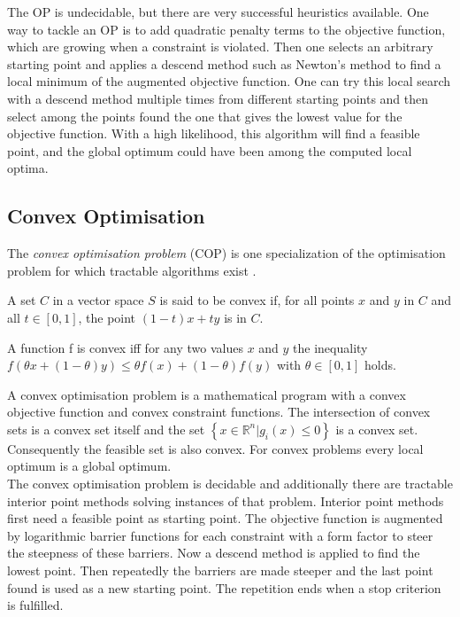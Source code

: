 The OP is undecidable, but there are very successful heuristics available. One way to tackle an OP is to add quadratic penalty terms to the objective function, which are growing when a constraint is violated. Then one selects an arbitrary starting point and applies a descend method such as Newton's method to find a local minimum of the augmented objective function. One can try this local search with a descend method multiple times from different starting points and then select among the points found the one that gives the lowest value for the objective function. With a high likelihood, this algorithm will find a feasible point, and the global optimum could have been among the computed local optima.
\subsection{Convex Optimisation}
The \emph{convex optimisation problem} (COP) is one specialization of the optimisation problem for which tractable algorithms exist \cite{Boyd04ConOpt}.
\begin{definition}
A set $C$ in a vector space $S$ is said to be convex if, for all points $x$ and $y$ in $C$ and all $t\in\left[0,1\right]$, the point $(1-t)x+ty$ is in $C$.
\end{definition}
\begin{definition}
A function f is convex iff for any two values $x$ and $y$ the inequality $ f(\theta x + (1-\theta) y)\leq \theta f(x)+(1-\theta) f(y)$ with $\theta\in \left[0,1\right] $ holds.
\end{definition}
A convex optimisation problem is a mathematical program with a convex objective function and convex constraint functions. The intersection of convex sets is a convex set itself and the set $\left\lbrace x\in\mathbb{R}^n|g_i(x)\leq 0\right\rbrace$ is a convex set. Consequently the feasible set is also convex. For convex problems every local optimum is a global optimum.\\
The convex optimisation problem is decidable and additionally there are tractable interior point methods solving instances of that problem. Interior point methods first need a feasible point as starting point. The objective function is augmented by logarithmic barrier functions for each constraint with a form factor to steer the steepness of these barriers. Now a descend method is applied to find the lowest point. Then repeatedly the barriers are made steeper and the last point found is used as a new starting point. The repetition ends when a stop criterion is fulfilled.
